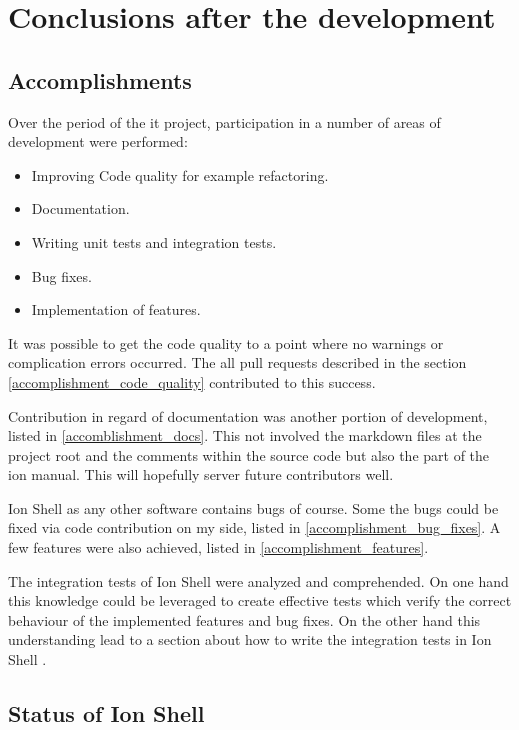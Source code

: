\chapter{Conclusions after the development}

\section{Accomplishments}

Over the period of the it project, participation in a number of areas of development were performed:

\begin{itemize}
	\item Improving Code quality for example refactoring.
	\item Documentation.
	\item Writing unit tests and integration tests.
	\item Bug fixes.
	\item Implementation of features.
\end{itemize}

It was possible to get the code quality to a point where no warnings or complication errors occurred.
The all pull requests described in the section \ref{accomplishment_code_quality} contributed to this success.

Contribution in regard of documentation was another portion of development, listed in \ref{accomblishment_docs}.
This not involved the markdown files at the project root and the comments within the source code but also the part of the ion manual.
This will hopefully server future contributors well.

Ion Shell as any other software contains bugs of course. Some the bugs could be fixed via code contribution on my side, listed in \ref{accomplishment_bug_fixes}.
A few features were also achieved, listed in \ref{accomplishment_features}.

The integration tests of Ion Shell were analyzed and comprehended. On one hand this knowledge could be leveraged to create effective tests
which verify the correct behaviour of the implemented features and bug fixes.
On the other hand this understanding lead to a section about how to write the integration tests in Ion Shell \cite{pr_docs_how_to_integration_test}.

\section{Status of Ion Shell}

